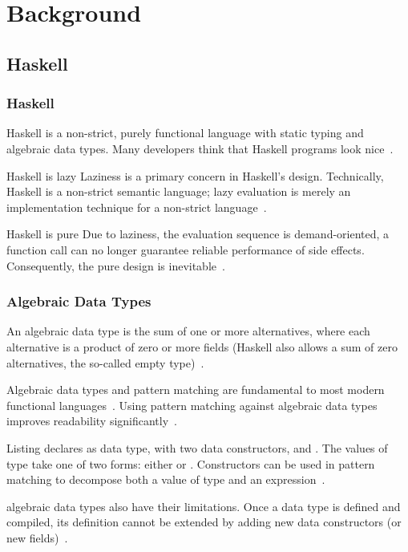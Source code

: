 \section{Background}

\subsection{Haskell}
\begin{frame}\frametitle{Haskell}

Haskell is a non-strict, purely functional language with static typing and algebraic data types. Many developers think that Haskell programs look nice~\cite{history-of-haskell}.

\footnotesize

\begin{block}{Haskell is lazy}
    Laziness is a primary concern in Haskell's design. Technically, Haskell is a non-strict semantic language; lazy evaluation is merely an implementation technique for a non-strict language~\cite{history-of-haskell}.
\end{block}

\begin{block}{Haskell is pure}
Due to laziness, the evaluation sequence is demand-oriented, a function call can no longer guarantee reliable performance of side effects. Consequently, the pure design is inevitable~\cite{history-of-haskell}.
\end{block}

\end{frame}

\begin{frame}\frametitle{Algebraic Data Types}

An algebraic data type is the sum of one or more alternatives, where each alternative is a product of zero or more fields (Haskell also allows a sum of zero alternatives, the so-called empty type)~\cite{history-of-haskell}. 

Algebraic data types and pattern matching are fundamental to most modern functional languages~\cite{trees-that-grow}. Using pattern matching against algebraic data types improves readability significantly~\cite{history-of-haskell}.
    

Listing  declares  as data type, with two data constructors,  and . The values of type  take one of two forms: either  or . Constructors can be used in pattern matching to decompose both a value of type and an expression~\cite{history-of-haskell}. 
    

algebraic data types also have their limitations. Once a data type is defined and compiled, its definition cannot be extended by adding new data constructors (or new fields)~\cite{trees-that-grow}.

\end{frame}

